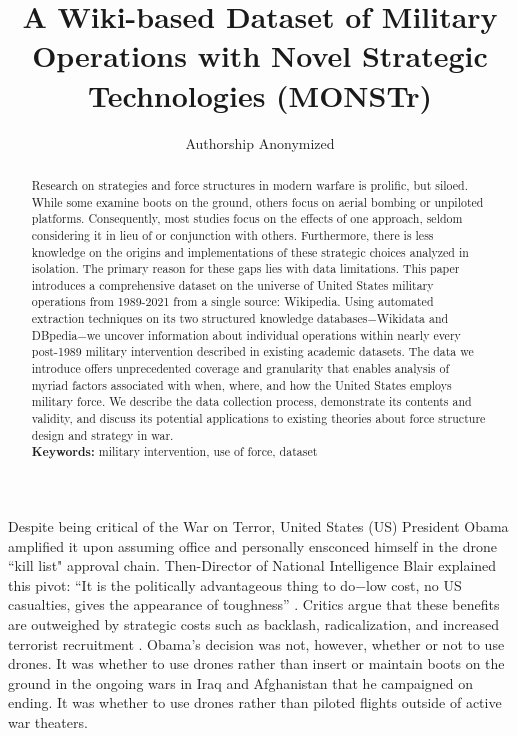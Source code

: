 \documentclass[fleqn,12pt]{article}
\title{\singlespacing A Wiki-based Dataset of Military Operations with Novel Strategic Technologies (MONSTr)}
\author{Authorship Anonymized}
\date{}
\begin{document}
	\maketitle
	\thispagestyle{empty}
	\setcounter{page}{0}
	
	\begin{abstract}
            \singlespacing \noindent Research on strategies and force structures in modern warfare is prolific, but siloed. While some examine boots on the ground, others focus on aerial bombing or unpiloted platforms. Consequently, most studies focus on the effects of one approach, seldom considering it in lieu of or conjunction with others. Furthermore, there is less knowledge on the origins and implementations of these strategic choices analyzed in isolation. The primary reason for these gaps lies with data limitations. This paper introduces a comprehensive dataset on the universe of United States military operations from 1989-2021 from a single source: Wikipedia. Using automated extraction techniques on its two structured knowledge databases$-$Wikidata and DBpedia$-$we uncover information about individual operations within nearly every post-1989 military intervention described in existing academic datasets. The data we introduce offers unprecedented coverage and granularity that enables analysis of myriad factors associated with when, where, and how the United States employs military force. We describe the data collection process, demonstrate its contents and validity, and discuss its potential applications to existing theories about force structure design and strategy in war.\\
		\vspace{.1in}
		\noindent
		\textbf{Keywords:} military intervention, use of force, dataset
	\end{abstract}
	
\newpage
\noindent

Despite being critical of the War on Terror, United States (US) President Obama amplified it upon assuming office and personally ensconced himself in the drone ``kill list" approval chain. Then-Director of National Intelligence Blair explained this pivot: ``It is the politically advantageous thing to do$-$low cost, no US casualties, gives the appearance of toughness” \citep{becker_secretkilllist_2012}. Critics argue that these benefits are outweighed by strategic costs such as backlash, radicalization, and increased terrorist recruitment \citep{kilcullen_opiniondeathoutrage_2009}. Obama's decision was not, however, whether or not to use drones. It was whether to use drones rather than insert or maintain boots on the ground in the ongoing wars in Iraq and Afghanistan that he campaigned on ending. It was whether to use drones rather than piloted flights outside of active war theaters.
	
\end{document}
